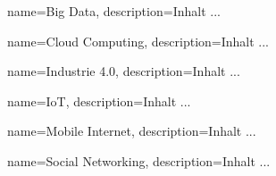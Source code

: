\makeglossaries




{
	name=Big Data,
	description={Inhalt ...}
}


{
	name=Cloud Computing,
	description={Inhalt ...}
}


{
	name=Industrie 4.0,
	description={Inhalt ...}
}


{
	name=IoT,
	description={Inhalt ...}
}


{
	name=Mobile Internet,
	description={Inhalt ...}
}


{
	name=Social Networking,
	description={Inhalt ...}
}


